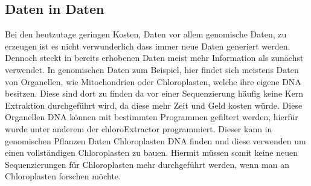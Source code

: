 \documentclass{scrartcl}
\begin{document}
\subsection{Daten in Daten}
\label{sec-2-4}
Bei den heutzutage geringen Kosten, Daten vor allem genomische Daten, zu erzeugen ist es nicht verwunderlich dass immer neue Daten generiert werden.
Dennoch steckt in bereits erhobenen Daten meist mehr Information als zunächst verwendet. In genomischen Daten zum Beispiel, hier findet sich meistens Daten 
von Organellen, wie Mitochondrien oder Chloroplasten, welche ihre eigene DNA besitzen. Diese sind dort zu finden da vor einer Sequenzierung häufig keine 
Kern Extraktion durchgeführt wird, da diese mehr Zeit und Geld kosten würde. Diese Organellen DNA können mit bestimmten Programmen gefiltert werden, hierfür 
wurde unter anderem der chloroExtractor programmiert. Dieser kann in genomischen Pflanzen Daten Chloroplasten DNA finden und diese verwenden um einen vollständigen
Chloroplasten zu bauen. Hiermit müssen somit keine neuen Sequenzierungen für Chloroplasten mehr durchgeführt werden, wenn man an Chloroplasten forschen möchte.
\end{document}
